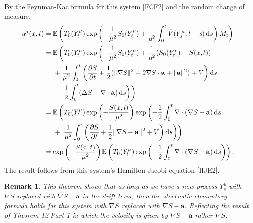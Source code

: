 \documentclass[a4paper,12pt,draft]{report}
\newtheorem{remark}{Remark}
\begin{document}
{\begin{align}
\end{align}
By the Feynman-Kac formula for this system \eqref{FCF2} and the random change of measure,
\begin{align}
u^\mu(x, t) & = \mathbb{E}\left(T_0(Y_t^\mu)\exp\left(-\frac{1}{\mu^2}S_0(Y_t^\mu) + \frac{1}{\mu^2}\int_0^t\bar{V}(Y_s^\mu, t - s)\,\mathrm{d}s\right)M_t\right)\nonumber\\
& = \mathbb{E}\left(T_0(Y_t^\mu)\exp\left(-\frac{1}{\mu^2}S_0(Y_t^\mu) + \frac{1}{\mu^2}(S_0(Y_t^\mu) - S(x, t))\right.\right.\nonumber\\
& \hspace{0.5cm} + \frac{1}{\mu^2}\int_0^t\left(\frac{\partial S}{\partial t} + \frac{1}{2}(\|\nabla S\|^2 - 2\nabla S\cdot\mathbf{a} + \|\mathbf{a}\|^2) + V\right)\mathrm{d}s\nonumber\\
& \hspace{0.5cm} - \left.\left.\frac{1}{2}\int_0^t(\Delta S - \nabla\cdot\mathbf{a})\,\mathrm{d}s\right)\right)\nonumber\\
& = \mathbb{E}\left(T_0(Y_t^\mu)\exp\left(-\frac{S(x, t)}{\mu^2}\right)\exp\left(-\frac{1}{2}\int_0^t\nabla\cdot(\nabla S - \mathbf{a})\,\mathrm{d}s\right.\right.\nonumber\\
& \hspace{0.5cm} + \left.\left.\frac{1}{\mu^2}\int_0^t\left(\frac{\partial S}{\partial t} + \frac{1}{2}\|\nabla S - \mathbf{a}\|^2 + V\right)\mathrm{d}s\right)\right)\nonumber\\
& = \exp\left(-\frac{S(x, t)}{\mu^2}\right)\mathbb{E}\left(T_0(Y_t^\mu)\exp\left(-\frac{1}{2}\int_0^t\nabla\cdot(\nabla S - \mathbf{a})\,\mathrm{d}s\right)\right).\nonumber
\end{align}
The result follows from this system's Hamilton-Jacobi equation \eqref{HJE2}.

\qedhere
}

\begin{remark}
{
This theorem shows that as long as we have a new process $Y_s^\mu$ with $\nabla S$ replaced with $\nabla S - \mathbf{a}$ in the drift term, then the stochastic elementary formula holds for this system with $\nabla S$ replaced with $\nabla S - \mathbf{a}$.  Reflecting the result of Theorem 12 Part 1 in which the velocity is given by $\nabla S - \mathbf{a}$ rather $\nabla S$.
}
\end{remark}
\end{document}
